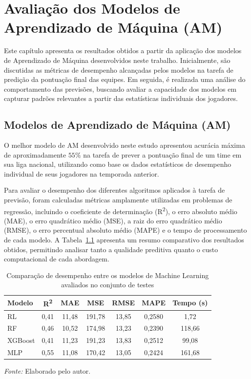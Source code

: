\chapter{Avaliação dos Modelos de Aprendizado de Máquina (AM)}

Este capítulo apresenta os resultados obtidos a partir da aplicação dos modelos de Aprendizado de Máquina desenvolvidos neste trabalho. 
Inicialmente, são discutidas as métricas de desempenho alcançadas pelos modelos na tarefa de predição da pontuação final das equipes. 
Em seguida, é realizada uma análise do comportamento das previsões, buscando avaliar a capacidade dos modelos em capturar padrões relevantes a partir das estatísticas 
individuais dos jogadores.

\section{Modelos de Aprendizado de Máquina (AM)}

O melhor modelo de AM desenvolvido neste estudo apresentou acurácia máxima de aproximadamente $55\%$ na tarefa de prever a pontuação final de um time em sua liga nacional, utilizando
como base os dados estatísticos de desempenho individual de seus jogadores na temporada anterior.

Para avaliar o desempenho dos diferentes algoritmos aplicados à tarefa de previsão, foram calculadas métricas 
amplamente utilizadas em problemas de regressão, incluindo o coeficiente de determinação (R\textsuperscript{2}), 
o erro absoluto médio (MAE), o erro quadrático médio (MSE), a raiz do erro quadrático médio (RMSE), 
o erro percentual absoluto médio (MAPE) e o tempo de processamento de cada modelo. A Tabela~\ref{tab:comparacao_modelos} 
apresenta um resumo comparativo dos resultados obtidos, permitindo analisar tanto a qualidade preditiva 
quanto o custo computacional de cada abordagem.

\begin{table}[H]
\centering
\caption{Comparação de desempenho entre os modelos de Machine Learning avaliados no conjunto de testes}
\label{tab:comparacao_modelos}
\begin{tabular}{lcccccc}
\hline
\textbf{Modelo} & \textbf{R\textsuperscript{2}} & \textbf{MAE} & \textbf{MSE} & \textbf{RMSE} & \textbf{MAPE} & \textbf{Tempo (s)} \\
\hline
RL      & 0,41 & 11,48 & 191,78 & 13,85 & 0,2580 & 1,72 \\
RF      & 0,46 & 10,52 & 174,98 & 13,23 & 0,2390 & 118,66 \\
XGBoost & 0,41 & 11,23 & 191,23 & 13,83 & 0,2512 & 99,08 \\
MLP     & 0,55 & 11,08 & 170,42 & 13,05 & 0,2424 & 161,68 \\
\hline
\end{tabular}

\vspace{0.3cm}
{\footnotesize \textit{Fonte:} Elaborado pelo autor.}

\end{table}

